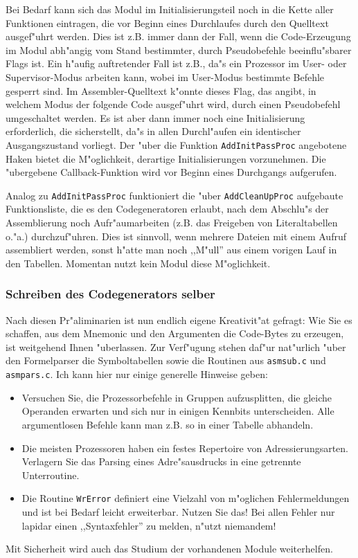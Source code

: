 \documentclass[12pt,a4paper,twoside]{report}
\newcommand{\tty}[1]{{\tt #1}}
\begin{document}
Bei Bedarf kann sich das Modul im Initialisierungsteil noch in die
Kette aller Funktionen eintragen, die vor Beginn eines Durchlaufes
durch den Quelltext ausgef"uhrt werden.  Dies ist z.B. immer dann der
Fall, wenn die Code-Erzeugung im Modul abh"angig vom Stand bestimmter,
durch Pseudobefehle beeinflu"sbarer Flags ist.  Ein h"aufig auftretender
Fall ist z.B., da"s ein Prozessor im User- oder Supervisor-Modus
arbeiten kann, wobei im User-Modus bestimmte Befehle gesperrt
sind.  Im Assembler-Quelltext k"onnte dieses Flag, das angibt, in welchem
Modus der folgende Code ausgef"uhrt wird, durch einen Pseudobefehl
umgeschaltet werden.  Es ist aber dann immer noch eine Initialisierung
erforderlich, die sicherstellt, da"s in allen Durchl"aufen ein identischer
Ausgangszustand vorliegt.  Der "uber die Funktion \tty{AddInitPassProc}
angebotene Haken bietet die M"oglichkeit, derartige Initialisierungen
vorzunehmen.  Die "ubergebene Callback-Funktion wird vor Beginn
eines Durchgangs aufgerufen.

Analog zu \tty{AddInitPassProc} funktioniert die "uber \tty{AddCleanUpProc}
aufgebaute Funktionsliste, die es den Codegeneratoren erlaubt, nach dem
Abschlu"s der Assemblierung noch Aufr"aumarbeiten (z.B. das Freigeben von
Literaltabellen o."a.) durchzuf"uhren.  Dies ist sinnvoll, wenn mehrere
Dateien mit einem Aufruf assembliert werden, sonst h"atte man noch
,,M"ull'' aus einem vorigen Lauf in den Tabellen.  Momentan nutzt kein
Modul diese M"oglichkeit.

\subsubsection{Schreiben des Codegenerators selber}

Nach diesen Pr"aliminarien ist nun endlich eigene Kreativit"at gefragt:
Wie Sie es schaffen, aus dem Mnemonic und den Argumenten die Code-Bytes zu
erzeugen, ist weitgehend Ihnen "uberlassen.  Zur Verf"ugung stehen daf"ur
nat"urlich "uber den Formelparser die Symboltabellen sowie die Routinen
aus
\tty{asmsub.c} und \tty{asmpars.c}.  Ich kann hier nur einige generelle
Hinweise geben:
\begin{itemize}
\item{Versuchen Sie, die Prozessorbefehle in Gruppen aufzusplitten, die
      gleiche Operanden erwarten und sich nur in einigen Kennbits
      unterscheiden.  Alle argumentlosen Befehle kann man z.B. so in einer
      Tabelle abhandeln.}
\item{Die meisten Prozessoren haben ein festes Repertoire von
      Adressierungsarten.  Verlagern Sie das Parsing eines Adre"sausdrucks
      in eine getrennte Unterroutine.}
\item{Die Routine \tty{WrError} definiert eine Vielzahl von m"oglichen
      Fehlermeldungen und ist bei Bedarf leicht erweiterbar.  Nutzen Sie
      das!  Bei allen Fehler nur lapidar einen ,,Syntaxfehler'' zu melden,
      n"utzt niemandem!}
\end{itemize}
Mit Sicherheit wird auch das Studium der vorhandenen Module weiterhelfen.
\end{document}
